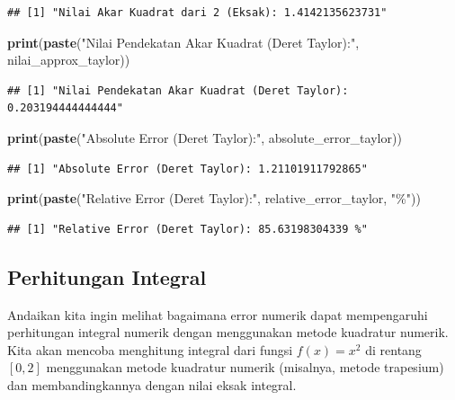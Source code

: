 \documentclass[
]{book}
\newenvironment{Shaded}{\begin{snugshade}}{\end{snugshade}}
\newcommand{\FunctionTok}[1]{\textcolor[rgb]{0.13,0.29,0.53}{\textbf{#1}}}
\newcommand{\NormalTok}[1]{#1}
\newcommand{\StringTok}[1]{\textcolor[rgb]{0.31,0.60,0.02}{#1}}
\theoremstyle{definition}
\theoremstyle{definition}
\theoremstyle{definition}
\theoremstyle{definition}
\theoremstyle{remark}
\begin{document}
\begin{verbatim}
## [1] "Nilai Akar Kuadrat dari 2 (Eksak): 1.4142135623731"
\end{verbatim}

\begin{Shaded}
\begin{Highlighting}[]
\FunctionTok{print}\NormalTok{(}\FunctionTok{paste}\NormalTok{(}\StringTok{"Nilai Pendekatan Akar Kuadrat (Deret Taylor):"}\NormalTok{, nilai\_approx\_taylor))}
\end{Highlighting}
\end{Shaded}

\begin{verbatim}
## [1] "Nilai Pendekatan Akar Kuadrat (Deret Taylor): 0.203194444444444"
\end{verbatim}

\begin{Shaded}
\begin{Highlighting}[]
\FunctionTok{print}\NormalTok{(}\FunctionTok{paste}\NormalTok{(}\StringTok{"Absolute Error (Deret Taylor):"}\NormalTok{, absolute\_error\_taylor))}
\end{Highlighting}
\end{Shaded}

\begin{verbatim}
## [1] "Absolute Error (Deret Taylor): 1.21101911792865"
\end{verbatim}

\begin{Shaded}
\begin{Highlighting}[]
\FunctionTok{print}\NormalTok{(}\FunctionTok{paste}\NormalTok{(}\StringTok{"Relative Error (Deret Taylor):"}\NormalTok{, relative\_error\_taylor, }\StringTok{"\%"}\NormalTok{))}
\end{Highlighting}
\end{Shaded}

\begin{verbatim}
## [1] "Relative Error (Deret Taylor): 85.63198304339 %"
\end{verbatim}

\hypertarget{perhitungan-integral}{%
\subsection{Perhitungan Integral}\label{perhitungan-integral}}

Andaikan kita ingin melihat bagaimana error numerik dapat mempengaruhi perhitungan integral numerik dengan menggunakan metode kuadratur numerik. Kita akan mencoba menghitung integral dari fungsi \(f(x)=x^2\) di rentang \([0, 2]\) menggunakan metode kuadratur numerik (misalnya, metode trapesium) dan membandingkannya dengan nilai eksak integral.
\end{document}
